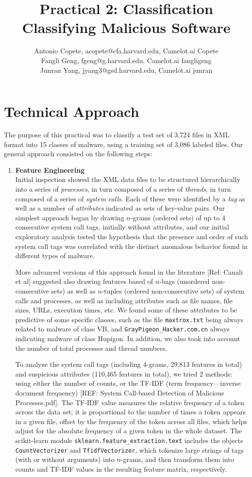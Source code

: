 \documentclass[11pt]{article}
\title{Practical 2: Classification\\ Classifying Malicious Software}
\author{Antonio Copete, acopete@cfa.harvard.edu, Camelot.ai Copete \\
	Fangli Geng, fgeng@g.harvard.edu, Camelot.ai fangligeng\\
	Junran Yang, jyang3@gsd.harvard.edu, Camelot.ai junran}
\begin{document}
\maketitle{}


\section{Technical Approach}

The purpose of this practical was to classify a test set of 3,724 files in XML format into 15 classes of malware, using a training set of 3,086 labeled files. Our general approach consisted on the following steps:

\begin{enumerate}
\item \textbf{Feature Engineering}\\
Initial inspection showed the XML data files to be structured hierarchically into a series of \emph{processes}, in turn composed of a series of \emph{threads}, in turn composed of a series of \emph{system calls}. Each of these were identified by a \emph{tag} as well as a number of \emph{attributes} indicated as sets of key-value pairs. Our simplest approach began by drawing $n$-grams (ordered sets) of up to 4 consecutive system call tags, initially without attributes, and our initial exploratory analysis tested the hypothesis that the presence and order of such system call tags was correlated with the distinct anomalous behavior found in different types of malware.

More advanced versions of this approach found in the literature [Ref: Canali et al] suggested also drawing features based of $n$-bags (unordered non-consecutive sets) as well as $n$-tuples (ordered non-consecutive sets) of system calls and processes, as well as including attributes such as file names, file sizes, URLs, execution times, etc. We found some of these attributes to be predictive of some specific classes, such as the file \verb|maxtrox.txt| being always related to malware of class VB, and \verb|GrayPigeon_Hacker.com.cn| always indicating malware of class Hupigon. In addition, we also took into account the number of total processes and thread numbers.

To analyze the system call tags (including 4-grams, 29,813 features in total) and suspicious attributes (110,465 features in total), we tried 2 methods: using either the number of counts, or the TF-IDF (term frequency---inverse document frequency) [REF: System Call-based Detection of Malicious Processes.pdf]. The TF-IDF value measures the relative frequency of a token across the data set; it is proportional to the number of times a token appears in a given file, offset by the frequency of the token across all files, which helps adjust for the absolute frequency of a given token in the whole dataset. The scikit-learn module \verb|sklearn.feature_extraction.text| includes the objects \verb|CountVectorizer| and \verb|TfidfVectorizer|, which tokenize large strings of tags (with or without arguments) into $n$-grams, and then transform them into counts and TF-IDF values in the resulting feature matrix, respectively.



\end{enumerate}
\end{document}

